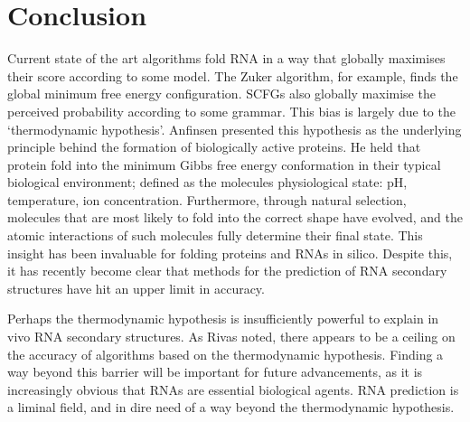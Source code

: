 \documentclass[12pt, a4paper]{article}
\begin{document}
\section{Conclusion}
Current state of the art algorithms fold RNA in a way that globally maximises their score according to some model. The Zuker algorithm, for example, finds the global minimum free energy configuration. SCFGs also globally maximise the perceived probability according to some grammar. This bias is largely due to the `thermodynamic hypothesis'. Anfinsen \cite{anfinsen1973principles} presented this hypothesis as the underlying principle behind the formation of biologically active proteins. He held that protein fold into the minimum Gibbs free energy conformation in their typical biological environment; defined as the molecules physiological state: pH, temperature, ion concentration. Furthermore, through natural selection, molecules that are most likely to fold into the correct shape have evolved, and the atomic interactions of such molecules fully determine their final state. This insight has been invaluable for folding proteins and RNAs in silico. Despite this, it has recently become clear that methods for the prediction of RNA secondary structures have hit an upper limit in accuracy.

Perhaps the thermodynamic hypothesis is insufficiently powerful to explain in vivo RNA secondary structures. As Rivas \cite{rivas2013four} noted, there appears to be a ceiling on the accuracy of algorithms based on the thermodynamic hypothesis. Finding a way beyond this barrier will be important for future advancements, as it is increasingly obvious that RNAs are essential biological agents. RNA prediction is a liminal field, and in dire need of a way beyond the thermodynamic hypothesis.







\end{document}
